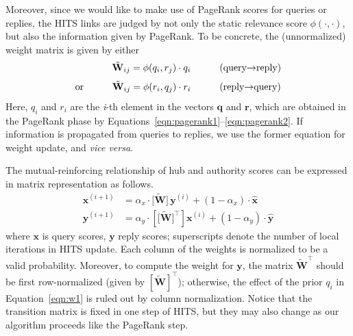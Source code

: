 \documentclass{sig-alternate-05-2015}
\begin{document}
Moreover, since we would like to make use of PageRank scores for queries or replies, the HITS links are judged by not only the static relevance score $\phi(\cdot,\cdot)$, but also the information given by PageRank. To be concrete, the (unnormalized) weight matrix is given by either
\begin{equation}
\text{\quad \quad\quad\quad\!}\tilde{\mathbf W}_{ij} = \phi(q_i, r_j)\cdot q_i\quad\quad\quad\text{(query$\rightarrow$reply)}
\label{eqn:w1}
\end{equation}
\begin{equation}
\text{or\quad\quad\quad} \tilde{\mathbf W}_{ij} = \phi(r_i, q_j)\cdot {r}_i\quad\quad\quad\text{(reply$\rightarrow$query)}
\label{eqn:w2}
\end{equation}
Here, $q_i$ and $r_i$ are the \textit{i}-th element in the vectors $\mathbf q$ and $\mathbf r$, which are obtained in the PageRank phase by Equations~\ref{eqn:pagerank1}--\ref{eqn:pagerank2}. If information is propagated from queries to replies, we use the former equation for weight update, and \textit{vice versa}.


The mutual-reinforcing relationship of hub and authority scores can be expressed in matrix representation as follows.
\begin{align}
\mathbf{x}^{(i+1)} &= \alpha_x\cdot \big[\tilde{\mathbf W}\big]\,\mathbf{y}^{(i)}+(1-\alpha_x)\cdot \hat{\mathbf{x}}\label{eqn:HITS2}\\
\mathbf{y}^{(i+1)} &= \alpha_y\cdot \left[\big[\tilde{\mathbf W}\big]^\top\right]\mathbf{x}^{(i)}+(1-\alpha_y)\cdot\hat{\mathbf{y}} \label{eqn:HITS1}
\end{align}
where $\mathbf x$ is query scores, $\mathbf y$ reply scores; superscripts denote the number of local iterations in HITS update.
Each column of the weights is normalized to be a valid probability. Moreover, to compute the weight for $\mathbf{y}$, the matrix $\mathbf{\tilde W}^\top$ should be first row-normalized (given by $[\mathbf{\tilde W}]^\top$); otherwise, the effect of the prior $q_i$ in Equation~\ref{eqn:w1} is ruled out by column normalization.
Notice that the transition matrix is fixed in one step of HITS, but they may also change as our algorithm proceeds like the PageRank step. 
\end{document}
